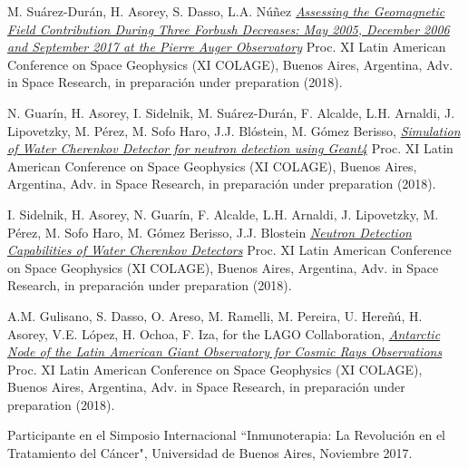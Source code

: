 \begin{etaremune}
\item {} M. Suárez-Durán, H. Asorey, S. Dasso, L.A. Núñez \href{}{\emph{Assessing the Geomagnetic Field Contribution During Three Forbush Decreases: May 2005, December 2006 and September 2017 at the Pierre Auger Observatory}} \en Proc. XI Latin American Conference on Space Geophysics (XI COLAGE), Buenos Aires, Argentina, Adv. in Space Research, \ifeng in preparación \else under preparation \fi (2018). %

\item {} N. Guarín, H. Asorey, I. Sidelnik, M. Suárez-Durán, F. Alcalde, L.H. Arnaldi, J. Lipovetzky, M. Pérez, M. Sofo Haro, J.J. Blóstein, M. Gómez Berisso, \href{}{\emph{Simulation of Water Cherenkov Detector for neutron detection using Geant4}} \en Proc. XI Latin American Conference on Space Geophysics (XI COLAGE),  Buenos Aires, Argentina, Adv. in Space Research, \ifeng in preparación \else under preparation \fi (2018). %

\item {} I. Sidelnik, H. Asorey, N. Guarín, F. Alcalde, L.H. Arnaldi, J. Lipovetzky, M. Pérez, M. Sofo Haro, M. Gómez Berisso, J.J. Blostein \href{}{\emph{Neutron Detection Capabilities of Water Cherenkov Detectors}} \en Proc. XI Latin American Conference on Space Geophysics (XI COLAGE),  Buenos Aires, Argentina, Adv. in Space Research, \ifeng in preparación \else under preparation \fi (2018). %

\item {} A.M. Gulisano, S. Dasso, O. Areso, M. Ramelli, M. Pereira, U. Hereñú, H. Asorey, V.E. López, H. Ochoa, F. Iza, for the LAGO Collaboration, \href{}{\emph{Antarctic Node of the Latin American Giant Observatory for Cosmic Rays Observations}} \en Proc. XI Latin American Conference on Space Geophysics (XI COLAGE),  Buenos Aires, Argentina, Adv. in Space Research, \ifeng in preparación \else under preparation \fi (2018). %
	
\item {} Participante en el Simposio Internacional ``Inmunoterapia: La Revolución en el Tratamiento del Cáncer", Universidad de Buenos Aires, Noviembre 2017. 


\end{etaremune}

